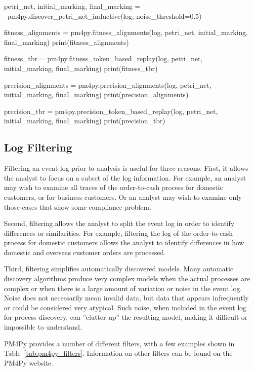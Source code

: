 \begin{samepage}
\begin{pythoncode}
petri_net, initial_marking, final_marking = \
    pm4py.discover_petri_net_inductive(log, noise_threshold=0.5)

fitness_alignments = pm4py.fitness_alignments(log,
    petri_net, initial_marking, final_marking)
print(fitness_alignments)

fitness_tbr = pm4py.fitness_token_based_replay(log, 
    petri_net, initial_marking, final_marking)
print(fitness_tbr)

precision_alignments = pm4py.precision_alignments(log,
    petri_net, initial_marking, final_marking)
print(precision_alignments)

precision_tbr = pm4py.precision_token_based_replay(log, 
    petri_net, initial_marking, final_marking)
print(precision_tbr)
\end{pythoncode}
\end{samepage}

\subsection*{Log Filtering}

Filtering an event log prior to analysis is useful for three reasons. First, it allows the analyst to focus on a subset of the log information. For example, an analyst may wish to examine all traces of the order-to-cash process for domestic customers, or for business customers. Or an analyst may wish to examine only those cases that show some compliance problem. 

Second, filtering allows the analyst to split the event log in order to identify differences or similarities. For example, filtering the log of the order-to-cash process for domestic customers allows the analyst to identify differences in how domestic and overseas customer orders are processed. 

Third, filtering simplifies automatically discovered models. Many automatic discovery algorithms produce very complex models when the actual processes are complex or when there is a large amount of variation or noise in the event log. Noise does not necessarily mean invalid data, but data that appears infrequently or could be considered very atypical. Such noise, when included in the event log for process discovery, can ''clutter up'' the resulting model, making it difficult or impossible to understand.

PM4Py provides a number of different filters, with a few examples shown in Table~\ref{tab:pm4py_filters}. Information on other filters can be found on the PM4Py website.

